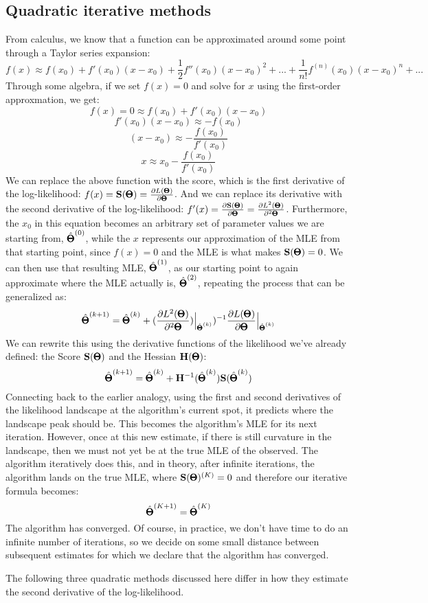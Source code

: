 \documentclass[12pt]{article}
\begin{document}
\subsection{Quadratic iterative methods}
From calculus, we know that a function can be approximated around some point through a Taylor series expansion:
$$
f(x) \approx f(x_0) + f'(x_0)(x - x_0) + \frac{1}{2} f''(x_0)(x - x_0)^2 + ... + \frac{1}{n!}f^{(n)}(x_0) (x - x_0)^n + ...
$$
Through some algebra, if we set $f(x) = 0$ and solve for $x$ using the first-order approxmation, we get:
$$ f(x) = 0 \approx f(x_0) + f'(x_0)(x - x_0) $$
$$ f'(x_0)(x - x_0) \approx - f(x_0)$$
$$ (x - x_0) \approx - \frac{f(x_0)}{f'(x_0)} $$
$$ x \approx x_0 - \frac{f(x_0)}{f'(x_0)} $$
We can replace the above function with the score, which is the first derivative of the log-likelihood:
$f(x) = \mathbf{S}(\pmb{\Theta}) = \frac{\partial L(\pmb{\Theta})}{\partial \pmb{\Theta}}$.
And we can replace its derivative with the second derivative of the log-likelihood:
$f'(x) = \frac{\partial \mathbf{S}(\pmb{\Theta})}{\partial \pmb{\Theta}} = \frac{\partial L^2(\pmb{\Theta})}{\partial^2 \pmb{\Theta}} $.
Furthermore, the $x_0$ in this equation becomes an arbitrary set of parameter values we are starting from, $\hat{\pmb{\Theta}}^{(0)}$,
while the $x$ represents our approximation of the MLE from that starting point, since $f(x) = 0$ and the MLE is what makes $\mathbf{S}(\pmb{\Theta}) = 0$.
We can then use that resulting MLE, $\hat{\pmb{\Theta}}^{(1)}$, as our starting point to again approximate where the MLE actually is, $\hat{\pmb{\Theta}}^{(2)}$, repeating the process that can be generalized as:
$$
\hat{\pmb{\Theta}}^{(k+1)} = 
\hat{\pmb{\Theta}}^{(k)} +
(\frac{\partial L^2(\pmb{\Theta})}{\partial^2 \pmb{\Theta}})
\Bigr|_{\hat{\pmb{\Theta}}^{(k)} })^{-1} 
\frac{\partial L(\pmb{\Theta})}{\partial \pmb{\Theta}}
\Bigr|_{\hat{\pmb{\Theta}}^{(k)} }
$$
We can rewrite this using the derivative functions of the likelihood we've already defined: the Score $\mathbf{S}(\pmb{\Theta})$ and the Hessian $\mathbf{H}(\pmb{\Theta})$:
$$
\hat{\pmb{\Theta}}^{(k+1)} = 
\hat{\pmb{\Theta}}^{(k)} +
\mathbf{H}^{-1} (\hat{\pmb{\Theta}}^{(k)})
\mathbf{S}(\hat{\pmb{\Theta}}^{(k)})
$$
Connecting back to the earlier analogy, using the first and second derivatives of the likelihood landscape at the algorithm's current spot, it predicts where the landscape peak should be.
This becomes the algorithm's MLE for its next iteration.
However, once at this new estimate, if there is still curvature in the landscape, then we must not yet be at the true MLE of the observed.
The algorithm iteratively does this, and in theory, after infinite iterations, the algorithm lands on the true MLE, where $\mathbf{S}(\pmb{\Theta})^{(K)} = 0$ and therefore our iterative formula becomes:
$$ \hat{\pmb{\Theta}}^{(K+1)} = \hat{\pmb{\Theta}}^{(K)}$$
The algorithm has converged. Of course, in practice, we don't have time to do an infinite number of iterations, so we decide on some small distance between subsequent estimates for which we declare that the algorithm has converged.

The following three quadratic methods discussed here differ in how they estimate the second derivative of the log-likelihood.
\end{document}
